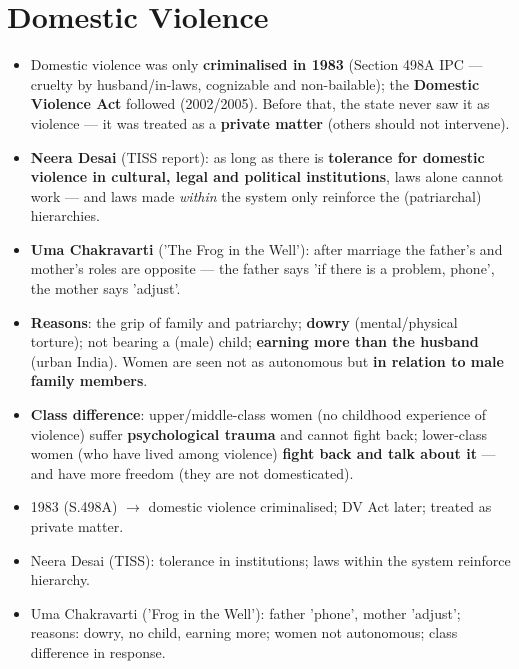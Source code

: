 \section{Domestic Violence}

\begin{KeyConcept}
\begin{itemize}
\item Domestic violence was only \textbf{criminalised in 1983} (Section 498A IPC --- cruelty by husband/in-laws, cognizable and non-bailable); the \textbf{Domestic Violence Act} followed (2002/2005). Before that, the state never saw it as violence --- it was treated as a \textbf{private matter} (others should not intervene).
\item \textbf{Neera Desai} (TISS report): as long as there is \textbf{tolerance for domestic violence in cultural, legal and political institutions}, laws alone cannot work --- and laws made \emph{within} the system only reinforce the (patriarchal) hierarchies.
\item \textbf{Uma Chakravarti} ('The Frog in the Well'): after marriage the father's and mother's roles are opposite --- the father says 'if there is a problem, phone', the mother says 'adjust'.
\item \textbf{Reasons}: the grip of family and patriarchy; \textbf{dowry} (mental/physical torture); not bearing a (male) child; \textbf{earning more than the husband} (urban India). Women are seen not as autonomous but \textbf{in relation to male family members}.
\item \textbf{Class difference}: upper/middle-class women (no childhood experience of violence) suffer \textbf{psychological trauma} and cannot fight back; lower-class women (who have lived among violence) \textbf{fight back and talk about it} --- and have more freedom (they are not domesticated).
\end{itemize}
\end{KeyConcept}

\begin{QuickRevision}
\begin{itemize}
\item 1983 (S.498A) $\rightarrow$ domestic violence criminalised; DV Act later; treated as private matter.
\item Neera Desai (TISS): tolerance in institutions; laws within the system reinforce hierarchy.
\item Uma Chakravarti ('Frog in the Well'): father 'phone', mother 'adjust'; reasons: dowry, no child, earning more; women not autonomous; class difference in response.
\end{itemize}
\end{QuickRevision}

